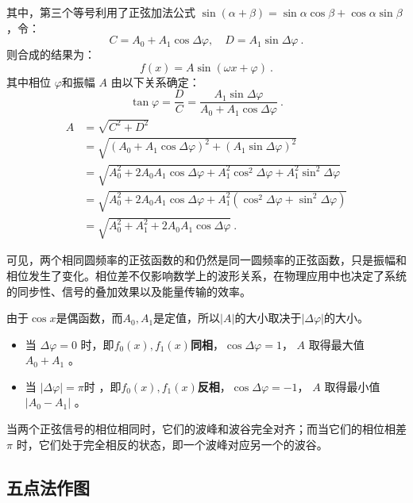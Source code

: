 其中，第三个等号利用了正弦加法公式 $\sin(\alpha + \beta) = \sin\alpha \cos\beta + \cos\alpha \sin\beta$，令：
\begin{equation}
C = A_0 + A_1 \cos \Delta \varphi, \quad D = A_1 \sin \Delta \varphi~.
\end{equation}
则合成的结果为：
\begin{equation}
f(x) = A \sin(\omega x + \varphi)~.
\end{equation}
其中相位 $\varphi$和振幅 $A$ 由以下关系确定：
\begin{equation}
\tan\varphi = \frac{D}{C} = \frac{A_1 \sin \Delta \varphi}{A_0 + A_1 \cos \Delta \varphi}~.
\end{equation}
\begin{equation}
\begin{split}
A &= \sqrt{C^2 + D^2} \\
&= \sqrt{(A_0 + A_1 \cos \Delta \varphi)^2 + (A_1 \sin \Delta \varphi)^2} \\
&= \sqrt{A_0^2 + 2 A_0 A_1 \cos \Delta \varphi + A_1^2 \cos^2 \Delta \varphi + A_1^2 \sin^2 \Delta \varphi} \\
&= \sqrt{A_0^2 + 2 A_0 A_1 \cos \Delta \varphi + A_1^2 (\cos^2 \Delta \varphi + \sin^2 \Delta \varphi)} \\
&= \sqrt{A_0^2 + A_1^2 + 2 A_0 A_1 \cos \Delta \varphi}~.
\end{split}
\end{equation}

可见，两个相同圆频率的正弦函数的和仍然是同一圆频率的正弦函数，只是振幅和相位发生了变化。相位差不仅影响数学上的波形关系，在物理应用中也决定了系统的同步性、信号的叠加效果以及能量传输的效率。

由于$\cos x$是偶函数，而$A_0,A_1$是定值，所以$|A|$的大小取决于$|\Delta \varphi|$的大小。
\begin{itemize}
\item 当 $\Delta \varphi=0$ 时，即$f_0(x),f_1(x)$\textbf{同相}，$\cos\Delta \varphi = 1$， $A$  取得最大值  $A_0 + A_1$ 。
\item 当 $|\Delta \varphi| = \pi$时 ，即$f_0(x),f_1(x)$\textbf{反相}，$\cos\Delta \varphi = -1$， $A$  取得最小值  $|A_0 - A_1|$ 。
\end{itemize}
当两个正弦信号的相位相同时，它们的波峰和波谷完全对齐；而当它们的相位相差 $\pi$ 时，它们处于完全相反的状态，即一个波峰对应另一个的波谷。


\subsection{五点法作图}

